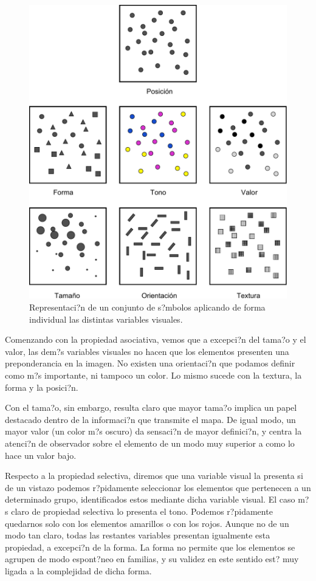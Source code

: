 \begin{figure}[!hbt]
\centering
\includegraphics[width=\columnwidth]{../es/Visualizacion/PropiedadesVariablesVisuales.pdf}
\caption{\small Representaci?n de un conjunto de s?mbolos aplicando de forma individual las distintas variables visuales.}
\label{Fig:PropiedadesVariablesVisuales} 
\end{figure}

Comenzando con la propiedad asociativa, vemos que a excepci?n del tama?o y el valor, las dem?s variables visuales no hacen que los elementos presenten una preponderancia en la imagen. No existen una orientaci?n que podamos definir como m?s importante, ni tampoco un color. Lo mismo sucede con la textura, la forma y la posici?n. 

Con el tama?o, sin embargo, resulta claro que mayor tama?o implica un papel destacado dentro de la informaci?n que transmite el mapa. De igual modo, un mayor valor (un color m?s oscuro) da sensaci?n de mayor definici?n, y centra la atenci?n de observador sobre el elemento de un modo muy superior a como lo hace un valor bajo.

Respecto a la propiedad selectiva, diremos que una variable visual la presenta si de un vistazo podemos r?pidamente seleccionar los elementos que pertenecen a un determinado grupo, identificados estos mediante dicha variable visual. El caso m?s claro de propiedad selectiva lo presenta el tono. Podemos r?pidamente quedarnos solo con los elementos amarillos o con los rojos. Aunque no de un modo tan claro, todas las restantes variables presentan igualmente esta propiedad, a excepci?n de la forma. La forma no permite que los elementos se agrupen de modo espont?neo en familias, y su validez en este sentido est? muy ligada a la complejidad de dicha forma.

